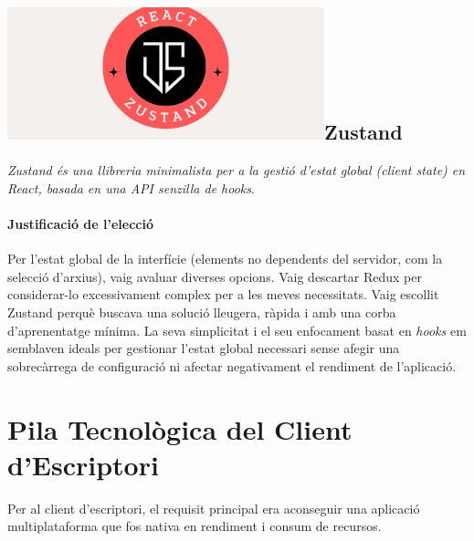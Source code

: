 \newcommand{\zustand}{\includegraphics[height=8ex]{Figures/logos/zustand.png}}

\subsection{\zustand\hspace{0.5em}Zustand}
\textit{Zustand és una llibreria minimalista per a la gestió d'estat global (client state) en React, basada en una API senzilla de hooks}.

\paragraph{Justificació de l'elecció}
Per l'estat global de la interfície (elements no dependents del servidor, com la selecció d'arxius), vaig avaluar diverses opcions. Vaig descartar Redux per considerar-lo excessivament complex per a les meves necessitats. Vaig escollit Zustand perquè buscava una solució lleugera, ràpida i amb una corba d'aprenentatge mínima. La seva simplicitat i el seu enfocament basat en \textit{hooks} em semblaven ideals per gestionar l'estat global necessari sense afegir una sobrecàrrega de configuració ni afectar negativament el rendiment de l'aplicació.

\section{Pila Tecnològica del Client d'Escriptori}
Per al client d'escriptori, el requisit principal era aconseguir una aplicació multiplataforma que fos nativa en rendiment i consum de recursos.


